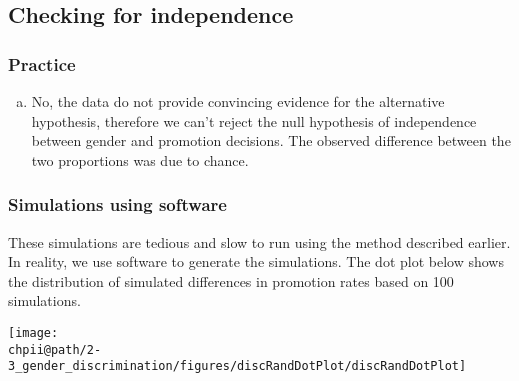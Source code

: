 \documentclass[slidestop,compress,mathserif]{beamer}
\makeatletter
\def\chpii@path{../../Chp 2}
\makeatother
\begin{document}

\subsection{Checking for independence}


\begin{frame}
\frametitle{Practice}


\begin{enumerate}[(a)]
\item No, the data do not provide convincing evidence for the alternative hypothesis, therefore we can't reject the null hypothesis of independence between gender and promotion decisions. The observed difference between the two proportions was due to chance.
\end{enumerate}

\end{frame}


\begin{frame}
\frametitle{Simulations using software}

These simulations are tedious and slow to run using the method described earlier. In reality, we use software to generate the simulations. The dot plot below shows the distribution of simulated differences in promotion rates based on 100 simulations.

\begin{center}
\texttt{[image: \\chpii@path/2-3\_gender\_discrimination/figures/discRandDotPlot/discRandDotPlot]}
\end{center}

\end{frame}


\end{document}

